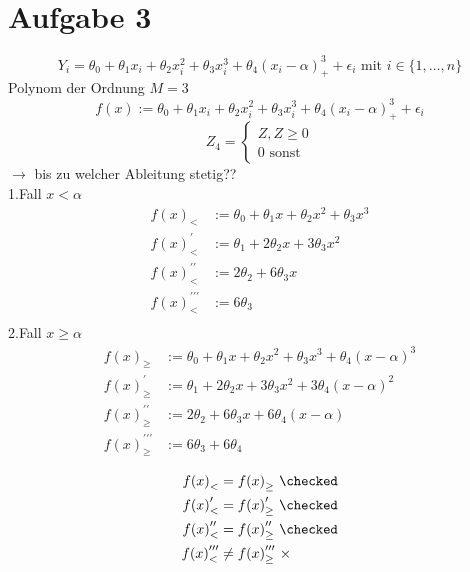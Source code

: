 \documentclass[10pt,a4paper]{article}
\begin{document}
\newpage
\section*{Aufgabe 3}
\[
  Y_i = \theta_0 + \theta_1 x_i + \theta_2 x_i^2 + \theta_3 x_i^3 + \theta_4 {(x_i - \alpha)}_+^3 +\epsilon_i
  \text{ mit } i \in \{1, \ldots , n\}
\]
Polynom der Ordnung \(M = 3\)
\[
  f(x):= \theta_0 + \theta_1 x_i + \theta_2 x_i^2 + \theta_3 x_i^3 + \theta_4 {(x_i - \alpha)}_+^3 +\epsilon_i
\]
\[
  Z_4=\begin{cases}
    Z, Z \geq 0 \\
   	0  \text{ sonst}
\end{cases}
\]
\( \rightarrow \) bis zu welcher Ableitung stetig??\\
1.Fall \( x< \alpha \)
\begin{align*}
    {f(x)}_{<} &:= \theta_0 + \theta_1 x + \theta_2 x^2 + \theta_3 x^3\\
    {f(x)}_{<}^{\prime} &:= \theta_1 + 2\theta_2 x + 3\theta_3 x^2\\
    {f(x)}_{<}^{\prime \prime} &:= 2\theta_2 + 6 \theta_3 x\\
    {f(x)}_{<}^{\prime \prime \prime} &:= 6 \theta_3\\
\end{align*}
2.Fall \( x \geq \alpha \)
\begin{align*}
    {f(x)}_{\geq} &:= \theta_0 + \theta_1 x + \theta_2 x^2 + \theta_3 x^3 + \theta_4 {(x - \alpha)}^3\\
    {f(x)}_{\geq}^{\prime} &:= \theta_1 + 2\theta_2 x + 3\theta_3 x^2 + 3 \theta_4 {(x-\alpha)}^2\\
    {f(x)}_{\geq}^{\prime \prime} &:= 2\theta_2 + 6 \theta_3 x + 6 \theta_4 (x-\alpha)\\
    {f(x)}_{\geq}^{\prime \prime \prime} &:= 6 \theta_3 + 6 \theta_4\\
\end{align*}
\begin{align*}
  {f(x)}_{<} &= {f(x)}_{\geq} \text{ } \checked \\
  {f(x)}_{<}^{\prime} &=   {f(x)}_{\geq}^{\prime} \text{ } \checked \\
  {f(x)}_{<}^{\prime \prime} &= {f(x)}_{\geq}^{\prime \prime}  \text{ } \checked \\
  {f(x)}_{<}^{\prime \prime \prime} &\neq {f(x)}_{\geq}^{\prime \prime \prime} \text{ } \times \\
\end{align*}
\end{document}
